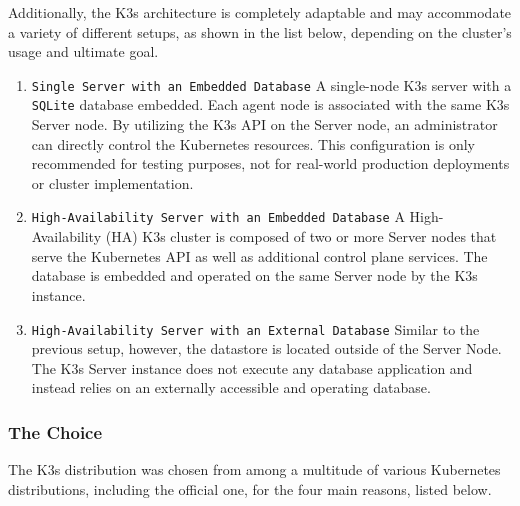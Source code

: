Additionally, the K3s architecture is completely adaptable and may accommodate a
variety of different setups, as shown in the list below, depending on the
cluster's usage and ultimate goal.
\begin{enumerate}
  \item \texttt{Single Server with an Embedded Database}
    \newline
    A single-node K3s server with a \texttt{SQLite} database embedded. Each
    agent node is associated with the same K3s Server node. By utilizing the K3s
    API on the Server node, an administrator can directly control the Kubernetes
    resources.
    \newline
    This configuration is only recommended for testing purposes, not for real-world
    production deployments or cluster implementation.

  \item \texttt{High-Availability Server with an Embedded Database}
    \newline
    A High-Availability (HA) K3s cluster is composed of two or more Server nodes
    that serve the Kubernetes API as well as additional control plane services. The
    database is embedded and operated on the same Server node by the K3s instance.

  \item \texttt{High-Availability Server with an External Database}
    \newline
    Similar to the previous setup, however, the datastore is located outside of
    the Server Node. The K3s Server instance does not execute any database application
    and instead relies on an externally accessible and operating database.
\end{enumerate}

\subsubsection{The Choice}
\label{subsubsec:implementation_dependencies_k3s_the_choice}

The K3s distribution was chosen from among a multitude of various Kubernetes distributions,
including the official one, for the four main reasons, listed below.

